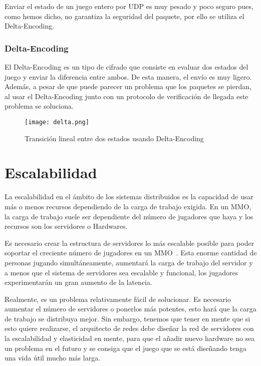 \documentclass[runningheads]{llncs}
\begin{document}
Enviar el estado de un juego entero por UDP es muy pesado y poco seguro pues, como hemos dicho, no garantiza la seguridad del paquete, por ello se utiliza el Delta-Encoding.

\subsubsection{Delta-Encoding}

El Delta-Encoding es un tipo de cifrado que consiste en evaluar dos estados del juego y enviar la diferencia entre ambos.
De esta manera, el envío es muy ligero.
Además, a pesar de que puede parecer un problema que los paquetes se pierdan, al usar el Delta-Encoding junto con un protocolo de verificación de llegada este problema se soluciona.

\begin{figure}[ht!]
\begin{center}
	\texttt{[image: delta.png]}
\end{center}
\caption{Transición lineal entre dos estados usando Delta-Encoding}
\end{figure}

\section{Escalabilidad}

La escalabilidad en el ámbito de los sistemas distribuidos es la capacidad de usar más o menos recursos dependiendo de la carga de trabajo exigida.
En un MMO, la carga de trabajo suele ser dependiente del número de jugadores que haya y los recursos son los servidores o Hardwares.

Es necesario crear la estructura de servidores lo más escalable posible para poder soportar el creciente número de jugadores en un MMO~\cite{dge_mmosg}.
Esta enorme cantidad de personas jugando simultáneamente, aumentará la carga de trabajo del servidor y a menos que el sistema de servidores sea escalable y funcional, los jugadores experimentarán un gran aumento de la latencia.

Realmente, es un problema relativamente fácil de solucionar.
Es necesario aumentar el número de servidores o ponerlos más potentes, esto hará que la carga de trabajo se distribuya mejor.
Sin embargo, tenemos que tener en mente que si esto quiere realizarse, el arquitecto de redes debe diseñar la red de servidores con la escalabilidad y elasticidad en mente, para que el añadir nuevo hardware no sea un problema en el futuro y se consiga que el juego que se está diseñando tenga una vida útil mucho más larga.
\end{document}
